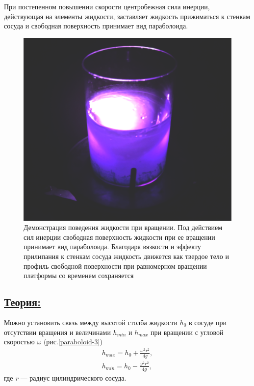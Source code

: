 \documentclass[14pt,a4paper,oneside]{extarticle}	%
\begin{document}
При постепенном повышении скорости центробежная сила инерции, действующая на элементы жидкости, заставляет жидкость прижиматься к стенкам сосуда и свободная поверхность принимает вид параболоида. 

\begin{figure}[H] 	
	\centering 	
	\includegraphics[width=0.6\linewidth]{paraboloid-2.png}
	\caption{Демонстрация поведения жидкости при вращении. Под действием сил инерции свободная поверхность жидкости при ее вращении принимает вид параболоида. Благодаря вязкости и эффекту прилипания к стенкам сосуда жидкость движется как твердое тело и профиль свободной поверхности при равномерном вращении платформы со временем сохраняется}
	\label{paraboloid-2}
\end{figure}


\subsection*{\underline{Теория:}}

Можно установить связь между высотой столба жидкости $ h_{0} $ в сосуде при отсутствии вращения и величинами $ h_{min} $ и $ h_{max} $ при вращении с угловой скоростью $ \omega $ (рис.\ref{paraboloid-3})
\begin{align}\label{1}
h_{max} = h_{0} + \frac{\omega^{2} r^{2}}{4g}, \\
h_{min} = h_{0} - \frac{\omega^{2} r^{2}}{4g},
\end{align}
где \textit{r} — радиус цилиндрического сосуда.
\end{document}
